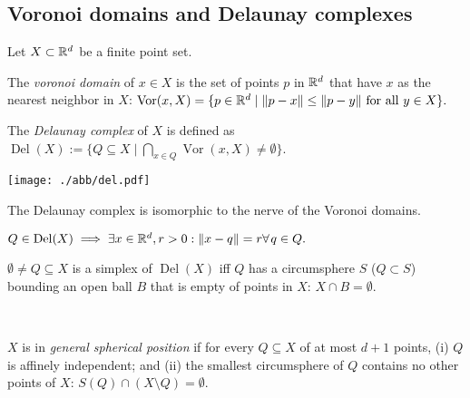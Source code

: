 \begin{multicols*}{3}
\subsection{Voronoi domains and Delaunay complexes}
Let $X\subset \mathbb{R}^d$ be a finite point set. \vspace{-0.6pc}
\begin{defi}
The \emph{voronoi domain} of $x\in X$ is the set of points $p$ in $\mathbb{R}^d$ that have $x$ as the nearest neighbor in $X$:
$
\operatorname{Vor}(x,X) = \{p\in\mathbb{R}^d \mid \|p-x\|\leq \|p-y\|\ \text{for all } y\in X\}.
$
\end{defi}
\rspace
\begin{defi}
The \emph{Delaunay complex} of $X$ is defined as
$\operatorname{Del} (X) := \{ Q\subseteq X  \mid \bigcap_{x\in Q}\operatorname{Vor}(x,X)\neq \emptyset\}$.
\begin{center}\vspace{-0.6pc}
\texttt{[image: ./abb/del.pdf]} \vspace{-0.5pc}
\end{center}
\end{defi}
\rspace
\begin{rem}
The Delaunay complex is isomorphic to the nerve of the Voronoi domains.
\end{rem}
\rspace
\begin{rem}
$Q\in \operatorname{Del}(X) \implies \exists x \in \R^d, r>0: \|x-q\|=r \forall q\in Q.$
\end{rem}
\rspace
\begin{remark}
$\emptyset \neq Q \subseteq X$ is a simplex of $\operatorname{Del} (X)$ iff $Q$ has a {circumsphere} $S$ ($Q\subset S$) bounding an open ball $B$ that is empty of points in $X$: $X\cap B= \emptyset$.
\end{remark}
\rspace\drawaline\\\vspace{-0.7pc}
\begin{definition}
$X$ is in \emph{general spherical position} if for every $Q\subseteq X$ of at most $d+1$ points, (i) $Q$ is affinely independent; and (ii) the smallest circumsphere of $Q$ contains no other points of $X$:
$S(Q) \cap (X\setminus Q) = \emptyset.$

\end{definition}
\end{multicols*}
